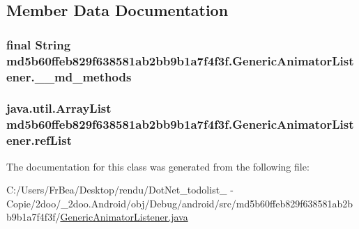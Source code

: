 \subsection{Member Data Documentation}
\hypertarget{classmd5b60ffeb829f638581ab2bb9b1a7f4f3f_1_1_generic_animator_listener_2cc0ec65c1c849bc5bff6baeb2599d15}{
\subsubsection[{\_\-\_\-md\_\-methods}]{\setlength{\rightskip}{0pt plus 5cm}final String {\bf md5b60ffeb829f638581ab2bb9b1a7f4f3f.GenericAnimatorListener.\_\-\_\-md\_\-methods}}}
\label{classmd5b60ffeb829f638581ab2bb9b1a7f4f3f_1_1_generic_animator_listener_2cc0ec65c1c849bc5bff6baeb2599d15}


\hypertarget{classmd5b60ffeb829f638581ab2bb9b1a7f4f3f_1_1_generic_animator_listener_e2594a26cfe234349eb9ef6ff43c4d1a}{
\subsubsection[{refList}]{\setlength{\rightskip}{0pt plus 5cm}java.util.ArrayList {\bf md5b60ffeb829f638581ab2bb9b1a7f4f3f.GenericAnimatorListener.refList}}}
\label{classmd5b60ffeb829f638581ab2bb9b1a7f4f3f_1_1_generic_animator_listener_e2594a26cfe234349eb9ef6ff43c4d1a}




The documentation for this class was generated from the following file:\begin{CompactItemize}
\item 
C:/Users/FrBea/Desktop/rendu/DotNet\_\-todolist\_ - Copie/2doo/\_\-2doo.Android/obj/Debug/android/src/md5b60ffeb829f638581ab2bb9b1a7f4f3f/\hyperlink{_generic_animator_listener_8java}{GenericAnimatorListener.java}\end{CompactItemize}
